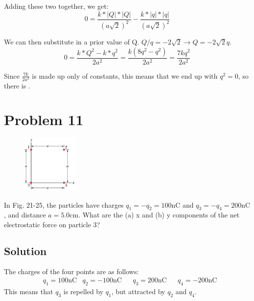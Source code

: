 \documentclass[12pt]{article}
\begin{document}
Adding these two together, we get:
\begin{equation}
    0 = \frac{k*|Q|*|Q|}{(a\sqrt{2})^2} - \frac{k*|q|*|q|}{(a\sqrt{2})^2}
\end{equation}

We can then substitute in a prior value of Q. $Q/q = -2\sqrt{2} \rightarrow Q = -2\sqrt{2}q$. 
\begin{equation}
    0 = \frac{k*Q^2 - k*q^2}{2a^2} = \frac{k(8q^2 - q^2)}{2a^2} = \frac{7kq^2}{2a^2}
\end{equation}

Since $\frac{7k}{2a^2}$ is made up only of constants, this means that we end up with $q^2 = 0$, so there is .


\pagebreak
\section*{Problem 11}
\begin{figure}
    \vspace{-30pt}
    \includegraphics[width=0.25\textwidth]{picture_4.png} 
\end{figure}
In Fig. 21-25, the particles have charges $q_1 = -q_2 = 100 \unit{\nano\coulomb}$ and $q_3 = -q_4 = 200 \unit{\nano\coulomb}$, and distance $a = 5.0\unit{\centi\meter}$. What are the (a) x and (b) y components of the net electrostatic force on particle 3?

\subsection*{Solution}
The charges of the four points are as follows: 
\begin{align*}
    &q_1 = 100\unit{\nano\coulomb}
    &q_2 = -100\unit{\nano\coulomb} &
    &q_3 = 200\unit{\nano\coulomb} &
    &q_4 = -200\unit{\nano\coulomb}
\end{align*}
This means that $q_3$ is repelled by $q_1$, but attracted by $q_2$ and $q_4$. 
\end{document}
